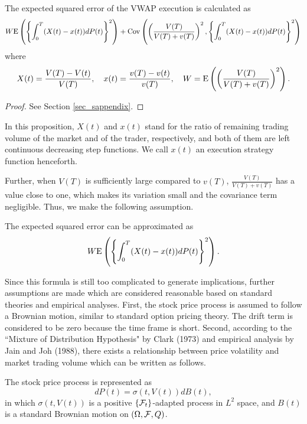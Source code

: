 \begin{proposition}\label{prop_s1}
 \quad The expected squared error of the VWAP execution is calculated as 
\[
  W {\mathrm{E}}\left( \left\{\int_0^T (X(t)-x(t))dP(t)\right\}^2 \right)+{\mathrm{Cov}}\left( \left(\frac{V(T)}{V(T)+v(T)}\right)^2, \left\{\int_0^T (X(t)-x(t))dP(t)\right\}^2 \right)
\]
where 
\[
 X(t)=\frac{V(T)-V(t)}{V(T)}, \quad x(t)=\frac{v(T)-v(t)}{v(T)},
 \quad W={\mathrm{E}}\left( \left(\frac{V(T)}{V(T)+v(T)}\right)^2 \right).
\]
\end{proposition}

\begin{proof}
  See Section \ref{sec_sappendix}.
\end{proof}

In this proposition, $X(t)$ and $x(t)$ stand for the ratio of remaining trading volume of the market and of the trader, respectively, and both of them are left continuous decreasing step functions.  We call $x(t)$ an execution strategy function henceforth.

Further, when $V(T)$ is sufficiently large compared to $v(T)$, $\frac{V(T)}{V(T)+v(T)}$ has a value close to one, which makes its variation small and the covariance term negligible.  Thus, we make the following assumption.

\begin{assumption}\label{ass_s1}
\quad The expected squared error can be approximated as
\begin{equation}\label{eq_s1}
  W {\mathrm{E}}\left( \left\{\int_0^T (X(t)-x(t))dP(t)\right\}^2 \right).
\end{equation}
\end{assumption}

Since this formula is still too complicated to generate implications, further assumptions are made which are considered reasonable based on standard theories and empirical analyses.  First, the stock price process is assumed to follow a Brownian motion, similar to standard option pricing theory.  The drift term is considered to be zero because the time frame is short.  Second, according to the ``Mixture of Distribution Hypothesis" by Clark (1973) and empirical analysis by Jain and Joh (1988), there exists a relationship between price volatility and market trading volume which can be written as follows.

\begin{assumption}\label{ass_s2}
 \quad The stock price process is represented as
\[
  dP(t)=\sigma(t,V(t))dB(t),
\]
in which $\sigma(t,V(t))$ is a positive $\{ {\cal F}_t \}$-adapted process in $L^2$ space, and $B(t)$ is a standard Brownian motion on $(\Omega, {\cal F}, Q)$.  
\end{assumption}

